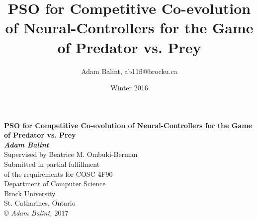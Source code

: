 \documentclass[12pt, letterpaper]{article}
\title{PSO for Competitive Co-evolution of Neural-Controllers for the Game of Predator vs. Prey}
\author{Adam Balint, ab11fl@brocku.ca}
\date{Winter 2016}
\begin{document}
\begin{titlepage}
\begin{center}
{\LARGE {\bf PSO for Competitive Co-evolution of Neural-Controllers for the Game of Predator vs. Prey}}
\\[3cm]
{\large{ \bf \textit{Adam Balint}}}
{\large \\ Supervised by Beatrice M. Ombuki-Berman}
\\[3cm]
{\large Submitted in partial fulfillment\\ of the requirements for COSC 4F90}
\\[3cm]
{\large Department of Computer Science\\Brock University\\
St. Catharines, Ontario}
\\[4cm]
\copyright \textit{ Adam Balint, $ 2017 $}
\end{center}
\end{titlepage}




\newpage

\tableofcontents

\newpage

\listoftables

\newpage

\listoffigures

\newpage 




 \newpage
 \newpage
 \newpage
 \newpage
 \newpage
 \newpage
 \newpage




%
%

\end{document}
